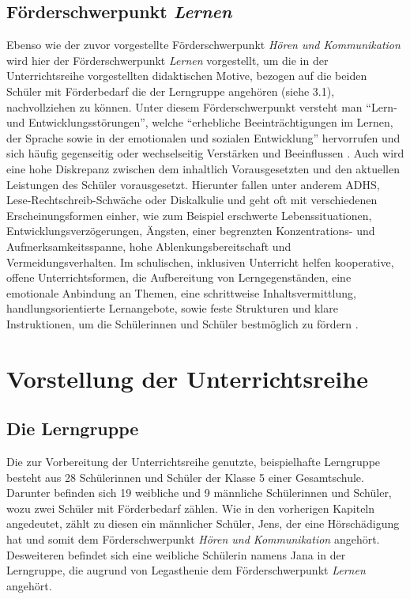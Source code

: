 \documentclass[12pt]{article}
\begin{document}
\subsection{Förderschwerpunkt \textit{Lernen}}
Ebenso wie der zuvor vorgestellte Förderschwerpunkt \textit{Hören und Kommunikation} wird hier der Förderschwerpunkt \textit{Lernen} vorgestellt, um die in der Unterrichtsreihe vorgestellten didaktischen Motive, bezogen auf die beiden Schüler mit Förderbedarf die der Lerngruppe angehören (siehe 3.1), nachvollziehen zu können. Unter diesem Förderschwerpunkt versteht man \enquote{Lern- und Entwicklungsstörungen}, welche \enquote{erhebliche Beeinträchtigungen im Lernen, der Sprache sowie
in der emotionalen und sozialen Entwicklung} hervorrufen und sich häufig gegenseitig oder wechselseitig Verstärken und Beeinflussen \autocite{qua-lis_nrw_kurz-informationen_2018}. Auch wird eine hohe Diskrepanz zwischen dem inhaltlich Vorausgesetzten und den aktuellen Leistungen des Schüler vorausgesetzt. Hierunter fallen unter anderem ADHS, Lese-Rechtschreib-Schwäche oder Diskalkulie und geht oft mit verschiedenen Erscheinungsformen einher, wie zum Beispiel erschwerte Lebenssituationen, Entwicklungsverzögerungen, Ängsten, einer begrenzten Konzentrations- und Aufmerksamkeitsspanne, hohe Ablenkungsbereitschaft und Vermeidungsverhalten. Im schulischen, inklusiven Unterricht helfen kooperative, offene Unterrichtsformen, die Aufbereitung von Lerngegenständen, eine emotionale Anbindung an Themen, eine schrittweise Inhaltsvermittlung, handlungsorientierte Lernangebote, sowie feste Strukturen und klare Instruktionen, um die Schülerinnen und Schüler bestmöglich zu fördern \autocite[vgl.][]{qua-lis_nrw_kurz-informationen_2018}.

\section{Vorstellung der Unterrichtsreihe}
\subsection{Die Lerngruppe}
Die zur Vorbereitung der Unterrichtsreihe genutzte, beispielhafte Lerngruppe besteht aus 28 Schülerinnen und Schüler der Klasse 5 einer Gesamtschule. Darunter befinden sich 19 weibliche und 9 männliche Schülerinnen und Schüler, wozu zwei Schüler mit Förderbedarf zählen. Wie in den vorherigen Kapiteln angedeutet, zählt zu diesen ein männlicher Schüler, Jens, der eine Hörschädigung hat und somit dem Förderschwerpunkt \textit{Hören und Kommunikation} angehört. Desweiteren befindet sich eine weibliche Schülerin namens Jana in der Lerngruppe, die augrund von Legasthenie dem Förderschwerpunkt \textit{Lernen} angehört. 
\end{document}
